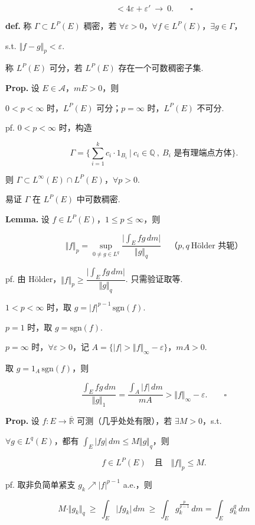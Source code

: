 \documentclass[11pt]{ctexart}
\theoremstyle{definition}
\begin{document}
\[
< 4\varepsilon + \varepsilon' \ \to\ 0. \qquad \square
\]

\textbf{def.} 称 $\Gamma \subset L^P(E)$ 稠密，若 $\forall \varepsilon > 0$，$\forall f \in L^P(E)$，$\exists g \in \Gamma$，

s.t. $\Vert f - g\Vert_p < \varepsilon$.

称 $L^P(E)$ 可分，若 $L^P(E)$ 存在一个可数稠密子集.

\textbf{Prop.} 设 $E \in \mathscr{A}$，$mE > 0$，则

$0 < p < \infty$ 时，$L^P(E)$ 可分；$p = \infty$ 时，$L^P(E)$ 不可分.

pf. $0 < p < \infty$ 时，构造

\[
\Gamma = \Big\{ \sum_{i=1}^{k} c_i \cdot 1_{B_i}\ \Big|\ c_i \in \mathbb{Q} \ ,\ B_i \text{ 是有理端点方体} \Big\}.
\]

则 $\Gamma \subset L^\infty(E) \cap L^P(E)$，$\forall p > 0$.

易证 $\Gamma$ 在 $L^P(E)$ 中可数稠密.

\textbf{Lemma.} 设 $f \in L^P(E)$，$1 \leq p \leq \infty$，则

\[
\Vert f\Vert_p = \sup_{0 \neq g \in L^q} \frac{\vert \int_E f g \, dm\vert}{\Vert g\Vert_q} \quad \text{（} p, q\ \text{Hölder 共轭} \text{）}
\]

pf. 由 Hölder，$\Vert f\Vert_p \geq \dfrac{\vert \int_E f g \, dm\vert}{\Vert g\Vert_q}$. 只需验证取等.

$1 < p < \infty$ 时，取 $g = \vert f\vert^{p-1}\, \mathrm{sgn}(f)$.

$p = 1$ 时，取 $g = \mathrm{sgn}(f)$.

$p = \infty$ 时，$\forall \varepsilon > 0$，记 $A = \{\vert f\vert > \Vert f\Vert_\infty - \varepsilon\}$，$mA > 0$.

取 $g = 1_A\, \mathrm{sgn}(f)$，则

\[
\frac{\int_E f g \, dm}{\Vert g\Vert_1} = \frac{\int_A \vert f\vert \, dm}{mA} > \Vert f\Vert_\infty - \varepsilon. \qquad \square
\]

\textbf{Prop.} 设 $f: E \to \overline{\mathbb{R}}$ 可测（几乎处处有限），若 $\exists M > 0$，s.t.

$\forall g \in L^q(E)$，都有 $\displaystyle\int_E \vert f g\vert \, dm \leq M \Vert g\Vert_q$，则

\[
f \in L^P(E) \quad \text{且} \quad \Vert f\Vert_p \leq M.
\]

pf. 取非负简单紧支 $g_k \nearrow \vert f\vert^{p-1}$  a.e.，则

\[
M \cdot \Vert g_k\Vert_q \ \geq\ \int_E \vert f g_k\vert \, dm \ \geq\ \int_E g_k^{\frac{p}{p-1}} \, dm = \int_E g_k^q \, dm
\]
\end{document}
